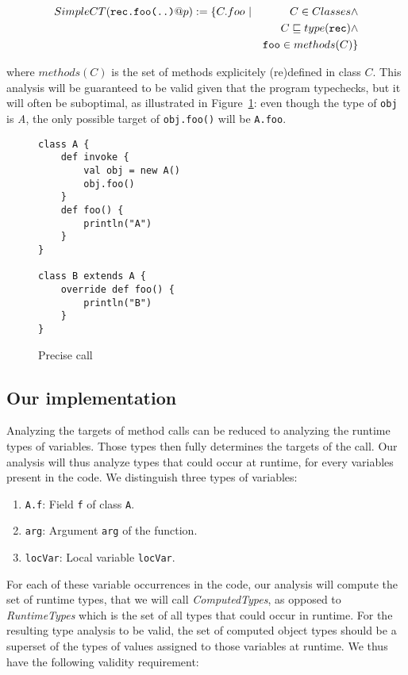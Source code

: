 \begin{eqnarray*}
        SimpleCT(\verb/rec.foo(..)/@p) := \{C.foo ~ &|& C \in Classes \land \\
        && C \subtype type(\verb/rec/) \land \\
        && \verb/foo/ \in methods(C) \}
\end{eqnarray*}

where $methods(C)$ is the set of methods explicitely (re)defined in class $C$.
This analysis will be guaranteed to be valid given that the program typechecks,
but it will often be suboptimal, as illustrated in
Figure~\ref{fig:ta:example2}: even though the type of \verb/obj/ is \emph{A},
the only possible target of \verb/obj.foo()/ will be \verb/A.foo/.

\begin{figure}[h]
    \centering

\begin{lstlisting}
class A {
    def invoke {
        val obj = new A()
        obj.foo()
    }
    def foo() {
        println("A")
    }
}

class B extends A {
    override def foo() {
        println("B")
    }
}
\end{lstlisting}

    \caption{Precise call}
    \label{fig:ta:example2}
\end{figure}

\subsection{Our implementation}
Analyzing the targets of method calls can be reduced to analyzing the runtime
types of variables. Those types then fully determines the targets of the call.
Our analysis will thus analyze types that could occur at runtime, for every
variables present in the code. We distinguish three types of variables:
\begin{enumerate}
    \item \verb/A.f/: Field \verb/f/ of class \verb/A/.
    \item \verb/arg/: Argument \verb/arg/ of the function.
    \item \verb/locVar/: Local variable \verb/locVar/.
\end{enumerate}

For each of these variable occurrences in the code, our analysis will compute
the set of runtime types, that we will call \emph{ComputedTypes}, as opposed to
\emph{RuntimeTypes} which is the set of all types that could occur in runtime.
For the resulting type analysis to be valid, the set of computed object types
should be a superset of the types of values assigned to those variables at
runtime.  We thus have the following validity requirement:

